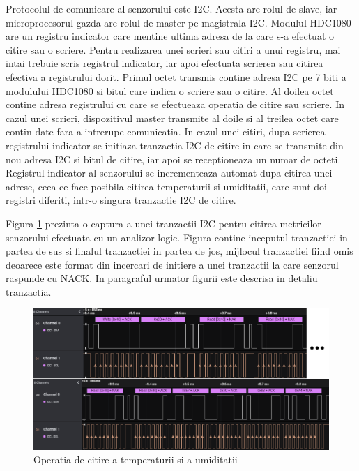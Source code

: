 Protocolul de comunicare al senzorului este I2C. Acesta are rolul de slave, iar microprocesorul gazda are rolul de master pe magistrala I2C. Modulul HDC1080 are un 
registru indicator care mentine ultima adresa de la care s-a efectuat o citire sau o scriere. Pentru realizarea unei scrieri sau citiri a unui registru, mai intai 
trebuie scris registrul indicator, iar apoi efectuata scrierea sau citirea efectiva a registrului dorit. Primul octet transmis contine adresa I2C pe 7 biti a 
modulului HDC1080 si bitul care indica o scriere sau o citire. Al doilea octet contine adresa registrului cu care se efectueaza operatia de citire sau scriere. 
In cazul unei scrieri, dispozitivul master transmite al doile si al treilea octet care contin date fara a intrerupe comunicatia. In cazul unei citiri, dupa scrierea 
registrului indicator se initiaza tranzactia I2C de citire in care se transmite din nou adresa I2C si bitul de citire, iar apoi se receptioneaza un numar de octeti. 
Registrul indicator al senzorului se incrementeaza automat dupa citirea unei adrese, ceea ce face posibila citirea temperaturii si umiditatii, care sunt doi registri 
diferiti, intr-o singura tranzactie I2C de citire.

Figura \ref{fig:PI_HDC1080ReadOperation} prezinta o captura a unei tranzactii I2C pentru citirea metricilor senzorului efectuata cu un analizor logic. Figura contine 
inceputul tranzactiei in partea de sus si finalul tranzactiei in partea de jos, mijlocul tranzactiei fiind omis deoarece este format din incercari de initiere a unei 
tranzactii la care senzorul raspunde cu NACK. In paragraful urmator figurii este descrisa in detaliu tranzactia.
\begin{figure}[H]
    \centering
    \includegraphics[scale=0.40]{figs/PI_HDC1080ReadOperation.png}
    \caption{Operatia de citire a temperaturii si a umiditatii}
    \label{fig:PI_HDC1080ReadOperation}
\end{figure}

